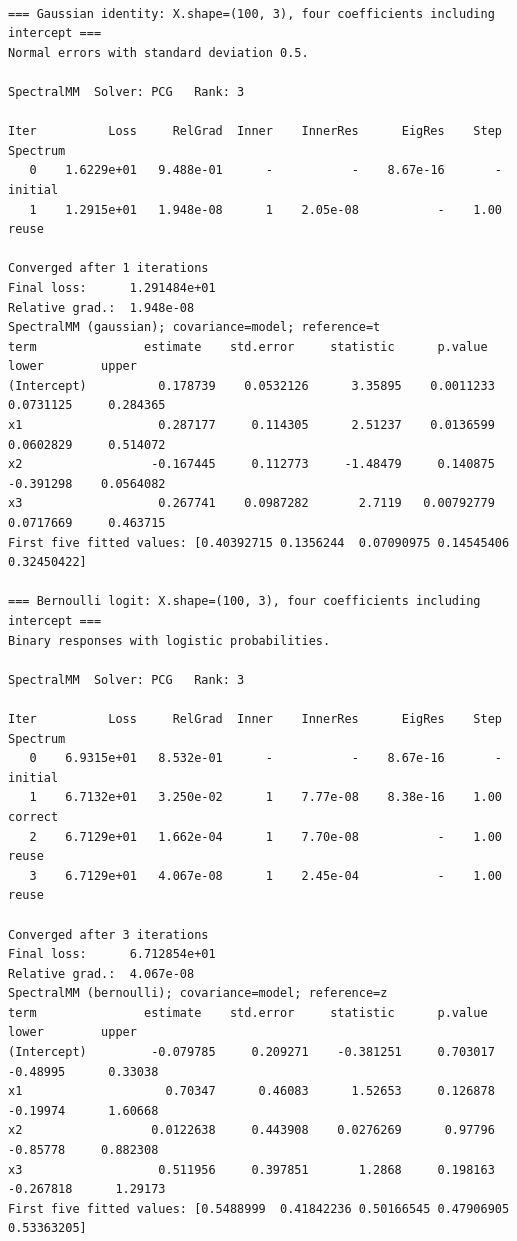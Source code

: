 \documentclass[11pt]{article}
\begin{document}
\begin{lstlisting}

=== Gaussian identity: X.shape=(100, 3), four coefficients including intercept ===
Normal errors with standard deviation 0.5.

SpectralMM  Solver: PCG   Rank: 3

Iter          Loss     RelGrad  Inner    InnerRes      EigRes    Step  Spectrum
   0    1.6229e+01   9.488e-01      -           -    8.67e-16       -  initial
   1    1.2915e+01   1.948e-08      1    2.05e-08           -    1.00  reuse

Converged after 1 iterations
Final loss:      1.291484e+01
Relative grad.:  1.948e-08
SpectralMM (gaussian); covariance=model; reference=t
term               estimate    std.error     statistic      p.value        lower        upper
(Intercept)          0.178739    0.0532126      3.35895    0.0011233    0.0731125     0.284365
x1                   0.287177     0.114305      2.51237    0.0136599    0.0602829     0.514072
x2                  -0.167445     0.112773     -1.48479     0.140875    -0.391298    0.0564082
x3                   0.267741    0.0987282       2.7119   0.00792779    0.0717669     0.463715
First five fitted values: [0.40392715 0.1356244  0.07090975 0.14545406 0.32450422]

=== Bernoulli logit: X.shape=(100, 3), four coefficients including intercept ===
Binary responses with logistic probabilities.

SpectralMM  Solver: PCG   Rank: 3

Iter          Loss     RelGrad  Inner    InnerRes      EigRes    Step  Spectrum
   0    6.9315e+01   8.532e-01      -           -    8.67e-16       -  initial
   1    6.7132e+01   3.250e-02      1    7.77e-08    8.38e-16    1.00  correct
   2    6.7129e+01   1.662e-04      1    7.70e-08           -    1.00  reuse
   3    6.7129e+01   4.067e-08      1    2.45e-04           -    1.00  reuse

Converged after 3 iterations
Final loss:      6.712854e+01
Relative grad.:  4.067e-08
SpectralMM (bernoulli); covariance=model; reference=z
term               estimate    std.error     statistic      p.value        lower        upper
(Intercept)         -0.079785     0.209271    -0.381251     0.703017     -0.48995      0.33038
x1                    0.70347      0.46083      1.52653     0.126878     -0.19974      1.60668
x2                  0.0122638     0.443908    0.0276269      0.97796     -0.85778     0.882308
x3                   0.511956     0.397851       1.2868     0.198163    -0.267818      1.29173
First five fitted values: [0.5488999  0.41842236 0.50166545 0.47906905 0.53363205]


\end{lstlisting}
\end{document}
